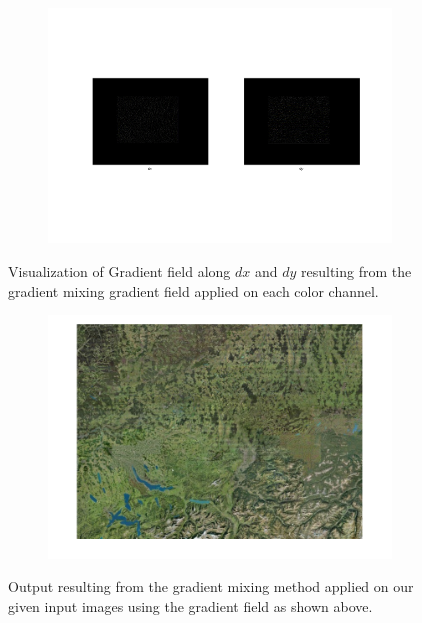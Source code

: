 \documentclass{paper}
\begin{document}
\begin{figure}[H]
    \centering
    \begin{subfigure}{1.0\textwidth}
        \includegraphics[width=\textwidth]{../../outputs/p4/seamless_cloning/map/gradients}
    \end{subfigure}
    \caption{Visualization of Gradient field along $dx$ and $dy$ resulting from the gradient mixing gradient field applied on each color channel.}
    \label{fig:gradient_mixing_gradients}       
\end{figure}


\begin{figure}[H]
    \centering
    \begin{subfigure}{1.0\textwidth}
        \includegraphics[width=\textwidth]{../../outputs/p4/seamless_cloning/map/output}
    \end{subfigure}
    \caption{Output resulting from the gradient mixing method applied on our given input images using the gradient field as shown above.}
    \label{fig:gradient_mixing_out}       
\end{figure}
\end{document}
